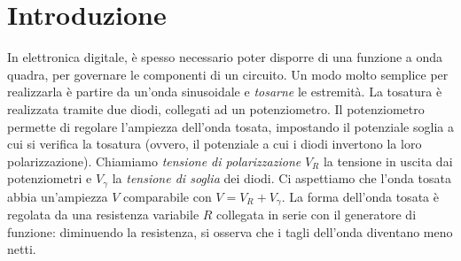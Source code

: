 \section{Introduzione}\label{sec:scopo}
In elettronica digitale, è spesso necessario poter disporre di una funzione
a onda quadra, per governare le componenti di un circuito.
Un modo molto semplice per realizzarla è partire
da un'onda sinusoidale e \emph{tosarne} le estremità.
La tosatura è realizzata tramite due diodi, collegati ad un potenziometro.
Il potenziometro permette di regolare l'ampiezza dell'onda tosata, impostando il
potenziale soglia a cui si verifica la tosatura (ovvero, il potenziale a cui i
diodi invertono la loro polarizzazione).
Chiamiamo \emph{tensione di polarizzazione} $V_{R}$ la tensione in uscita dai potenziometri
e $V_{\gamma}$ la \emph{tensione di soglia} dei diodi.
Ci aspettiamo che l'onda tosata abbia un'ampiezza $V$ comparabile con $V = V_R + V_\gamma$.
La forma dell'onda tosata è regolata da una resistenza variabile $R$ collegata in serie con il
generatore di funzione: diminuendo la resistenza, si osserva che i tagli dell'onda
diventano meno netti.
